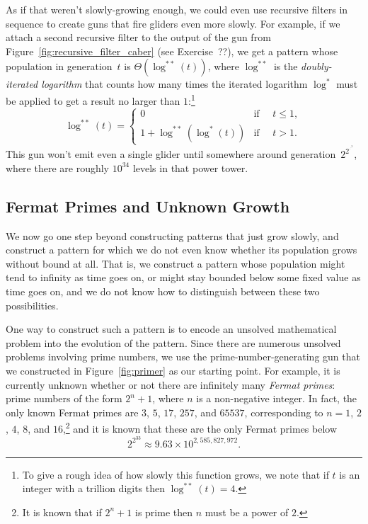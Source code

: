 As if that weren't slowly-growing enough, we could even use recursive filters in sequence to create guns that fire gliders even more slowly. For example, if we attach a second recursive filter to the output of the gun from Figure~\ref{fig:recursive_filter_caber} (see Exercise~??), we get a pattern whose population in generation~$t$ is $\Theta(\log^{**}(t))$, where $\log^{**}$ is the \emph{doubly-iterated logarithm} that counts how many times the iterated logarithm $\log^*$ must be applied to get a result no larger than $1$:\footnote{To give a rough idea of how slowly this function grows, we note that if $t$ is an integer with a trillion digits then $\log^{**}(t) = 4$.}
\[
	\log^{**}(t) =
	\begin{cases}
	0                  & \mbox{if } \quad t \leq 1, \\
	1 + \log^{**}(\log^{*}(t)) & \mbox{if } \quad t > 1.
	\end{cases}
\]
This gun won't emit even a single glider until somewhere around generation~$2^{2^{\cdot^{\cdot^{2}}}}$, where there are roughly $10^{34}$ levels in that power tower.




\subsection{Fermat Primes and Unknown Growth}\label{sec:unknown_growth}

We now go one step beyond constructing patterns that just grow slowly, and construct a pattern for which we do not even know whether its population grows without bound at all. That is, we construct a pattern whose population might tend to infinity as time goes on, or might stay bounded below some fixed value as time goes on, and we do not know how to distinguish between these two possibilities.

One way to construct such a pattern is to encode an unsolved mathematical problem into the evolution of the pattern. Since there are numerous unsolved problems involving prime numbers, we use the prime-number-generating gun that we constructed in Figure~\ref{fig:primer} as our starting point. For example, it is currently unknown whether or not there are infinitely many \emph{Fermat primes}: prime numbers of the form $2^n + 1$, where $n$ is a non-negative integer. In fact, the only known Fermat primes are $3$, $5$, $17$, $257$, and $65537$, corresponding to $n = 1$, $2$, $4$, $8$, and $16$,\footnote{It is known that if $2^n+1$ is prime then $n$ must be a power of $2$.} and it is known that these are the only Fermat primes below
\[
	2^{2^{33}} \approx 9.63 \times 10^{2,585,827,972}.
\]

